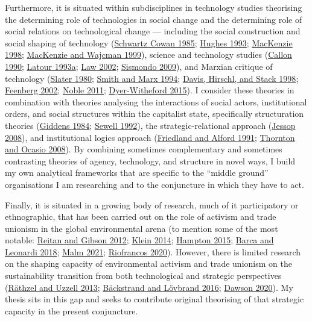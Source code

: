 \documentclass[a4paper, nobind]{templates/ociamthesis}
\begin{document}
Furthermore, it is situated within subdisciplines in technology studies theorising the determining role of technologies in social change and the determining role of social relations on technological change --- including the social construction and social shaping of technology (\protect\hyperlink{ref-schwartz_cowan_more_1985}{Schwartz Cowan 1985}; \protect\hyperlink{ref-hughes_networks_1993}{Hughes 1993}; \protect\hyperlink{ref-mackenzie_knowing_1998}{MacKenzie 1998}; \protect\hyperlink{ref-mackenzie_social_1999}{MacKenzie and Wajcman 1999}), science and technology studies (\protect\hyperlink{ref-callon_techno-economic_1990}{Callon 1990}; \protect\hyperlink{ref-latour_we_1993}{Latour 1993a}; \protect\hyperlink{ref-law_aircraft_2002}{Law 2002}; \protect\hyperlink{ref-sismondo_introduction_2009}{Sismondo 2009}), and Marxian critique of technology (\protect\hyperlink{ref-slater_outlines_1980}{Slater 1980}; \protect\hyperlink{ref-smith_does_1994}{Smith and Marx 1994}; \protect\hyperlink{ref-davis_cutting_1998}{Davis, Hirschl, and Stack 1998}; \protect\hyperlink{ref-feenberg_transforming_2002}{Feenberg 2002}; \protect\hyperlink{ref-noble_forces_2011}{Noble 2011}; \protect\hyperlink{ref-dyer-witheford_cyber-proletariat_2015}{Dyer-Witheford 2015}). I consider these theories in combination with theories analysing the interactions of social actors, institutional orders, and social structures within the capitalist state, specifically structuration theories (\protect\hyperlink{ref-giddens_constitution_1984}{Giddens 1984}; \protect\hyperlink{ref-sewell_theory_1992}{Sewell 1992}), the strategic-relational approach (\protect\hyperlink{ref-jessop_state_2008}{Jessop 2008}), and institutional logics approach (\protect\hyperlink{ref-friedland_bringing_1991}{Friedland and Alford 1991}; \protect\hyperlink{ref-thornton_institutional_2008}{Thornton and Ocasio 2008}). By combining sometimes complementary and sometimes contrasting theories of agency, technology, and structure in novel ways, I build my own analytical frameworks that are specific to the ``middle ground'' organisations I am researching and to the conjuncture in which they have to act.

Finally, it is situated in a growing body of research, much of it participatory or ethnographic, that has been carried out on the role of activism and trade unionism in the global environmental arena (to mention some of the most notable: \protect\hyperlink{ref-reitan_climate_2012}{Reitan and Gibson 2012}; \protect\hyperlink{ref-klein_this_2014}{Klein 2014}; \protect\hyperlink{ref-hampton_workers_2015}{Hampton 2015}; \protect\hyperlink{ref-barca_working-class_2018}{Barca and Leonardi 2018}; \protect\hyperlink{ref-malm_how_2021}{Malm 2021}; \protect\hyperlink{ref-riofrancos_resource_2020}{Riofrancos 2020}). However, there is limited research on the shaping capacity of environmental activism and trade unionism on the sustainability transition from both technological and strategic perspectives (\protect\hyperlink{ref-rathzel_trade_2013}{Räthzel and Uzzell 2013}; \protect\hyperlink{ref-backstrand_climate_2016}{Bäckstrand and Lövbrand 2016}; \protect\hyperlink{ref-dawson_peoples_2020}{Dawson 2020}). My thesis sits in this gap and seeks to contribute original theorising of that strategic capacity in the present conjuncture.
\end{document}

